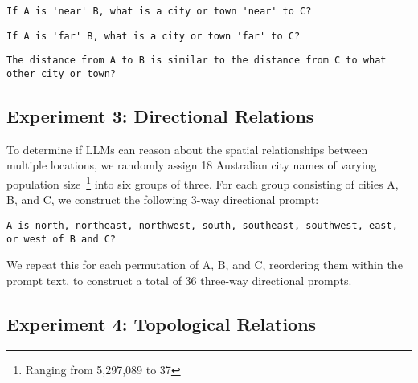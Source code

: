 \begin{lstlisting}[title=`Near' Metric Prompt]
    If A is 'near' B, what is a city or town 'near' to C?
\end{lstlisting}

\begin{lstlisting}[title=`Far' Metric Prompt]
    If A is 'far' B, what is a city or town 'far' to C?
\end{lstlisting}

\begin{lstlisting}[title=Neutral Metric Prompt]
    The distance from A to B is similar to the distance from C to what other city or town?
\end{lstlisting}




\subsection{Experiment 3: Directional Relations}


To determine if LLMs can reason about the spatial relationships between multiple locations, we randomly assign 18 Australian city names of varying population size~\footnote{Ranging from 5,297,089 to 37} into six groups of three.
For each group consisting of cities A, B, and C, we construct the following 3-way directional prompt: 

\begin{lstlisting}[title=3-way Directional Prompt]
    A is north, northeast, northwest, south, southeast, southwest, east, or west of B and C?
\end{lstlisting}





We repeat this for each permutation of A, B, and C, reordering them within the prompt text, to construct a total of 36 three-way directional prompts.



\subsection{Experiment 4: Topological Relations}

